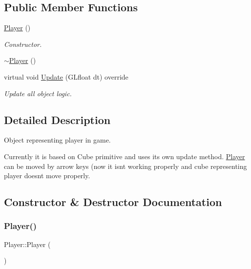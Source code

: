 \subsection*{Public Member Functions}
\begin{DoxyCompactItemize}
\item 
\mbox{\hyperlink{class_player_affe0cc3cb714f6deb4e62f0c0d3f1fd8}{Player}} ()
\begin{DoxyCompactList}\small\item\em Constructor. \end{DoxyCompactList}\item 
\mbox{\hyperlink{class_player_a749d2c00e1fe0f5c2746f7505a58c062}{$\sim$\+Player}} ()
\item 
virtual void \mbox{\hyperlink{class_player_ab0c993660b14593274c199fa0d774ad7}{Update}} (G\+Lfloat dt) override
\begin{DoxyCompactList}\small\item\em Update all object logic. \end{DoxyCompactList}\end{DoxyCompactItemize}


\subsection{Detailed Description}
Object representing player in game. 

Currently it is based on Cube primitive and uses it\textquotesingle{}s own update method. \mbox{\hyperlink{class_player}{Player}} can be moved by arrow keys (now it isn\textquotesingle{}t working properly and cube representing player doesn\textquotesingle{}t move properly. 

\subsection{Constructor \& Destructor Documentation}
\mbox{\label{class_player_affe0cc3cb714f6deb4e62f0c0d3f1fd8}} 
\subsubsection{\texorpdfstring{Player()}{Player()}}
{\footnotesize\ttfamily Player\+::\+Player (\begin{DoxyParamCaption}{ }\end{DoxyParamCaption})}



